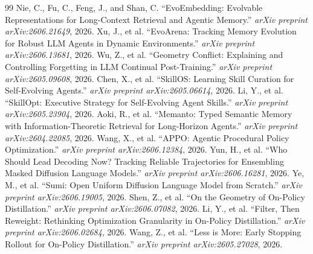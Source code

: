 \documentclass[11pt,a4paper]{article}
\begin{document}
\begin{thebibliography}{99}
 Nie, C., Fu, C., Feng, J., and Shan, C. ``EvoEmbedding: Evolvable Representations for Long-Context Retrieval and Agentic Memory.'' \emph{arXiv preprint arXiv:2606.21649}, 2026.
 Xu, J., et al. ``EvoArena: Tracking Memory Evolution for Robust LLM Agents in Dynamic Environments.'' \emph{arXiv preprint arXiv:2606.13681}, 2026.
 Wu, Z., et al. ``Geometry Conflict: Explaining and Controlling Forgetting in LLM Continual Post-Training.'' \emph{arXiv preprint arXiv:2605.09608}, 2026.
 Chen, X., et al. ``SkillOS: Learning Skill Curation for Self-Evolving Agents.'' \emph{arXiv preprint arXiv:2605.06614}, 2026.
 Li, Y., et al. ``SkillOpt: Executive Strategy for Self-Evolving Agent Skills.'' \emph{arXiv preprint arXiv:2605.23904}, 2026.
 Aoki, R., et al. ``Memanto: Typed Semantic Memory with Information-Theoretic Retrieval for Long-Horizon Agents.'' \emph{arXiv preprint arXiv:2604.22085}, 2026.
 Wang, X., et al. ``APPO: Agentic Procedural Policy Optimization.'' \emph{arXiv preprint arXiv:2606.12384}, 2026.
 Yun, H., et al. ``Who Should Lead Decoding Now? Tracking Reliable Trajectories for Ensembling Masked Diffusion Language Models.'' \emph{arXiv preprint arXiv:2606.16281}, 2026.
 Ye, M., et al. ``Sumi: Open Uniform Diffusion Language Model from Scratch.'' \emph{arXiv preprint arXiv:2606.19005}, 2026.
 Shen, Z., et al. ``On the Geometry of On-Policy Distillation.'' \emph{arXiv preprint arXiv:2606.07082}, 2026.
 Li, Y., et al. ``Filter, Then Reweight: Rethinking Optimization Granularity in On-Policy Distillation.'' \emph{arXiv preprint arXiv:2606.02684}, 2026.
 Wang, Z., et al. ``Less is More: Early Stopping Rollout for On-Policy Distillation.'' \emph{arXiv preprint arXiv:2605.27028}, 2026.
\end{thebibliography}
\end{document}
